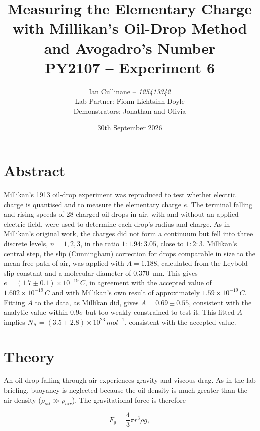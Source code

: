 \documentclass[12pt,a4paper]{article}
\title{
    \Large\textbf{Measuring the Elementary Charge with Millikan's Oil-Drop Method and Avogadro's Number}\\[0.5em]
    \large PY2107 -- Experiment 6
}
\author{
    Ian Cullinane -- \textit{125413342}\\[0.5em]
    Lab Partner: Fionn Lichtsinn Doyle\\[0.5em]
    Demonstrators: Jonathan and Olivia
}
\date{30th September 2026}
\begin{document}
\maketitle
\thispagestyle{empty}

\newpage
\tableofcontents
\newpage

\section{Abstract}

Millikan's 1913 oil-drop experiment was reproduced to test whether electric
charge is quantised and to measure the elementary charge $e$. The terminal
falling and rising speeds of 28 charged oil drops in air, with and without an
applied electric field, were used to determine each drop's radius and charge.
As in Millikan's original work, the charges did not form a continuum but fell
into three discrete levels, $n=1,2,3$, in the ratio $1:1.94:3.05$, close to
$1:2:3$. Millikan's central step, the slip (Cunningham) correction for drops
comparable in size to the mean free path of air, was applied with
$A=1.188$, calculated from the Leybold slip constant and a molecular diameter
of \SI{0.370}{nm}. This gives $e=(1.7\pm0.1)\times10^{-19}\,\si{C}$, in
agreement with the accepted value of $1.602\times10^{-19}\,\si{C}$ and with
Millikan's own result of approximately $1.59\times10^{-19}\,\si{C}$. Fitting
$A$ to the data, as Millikan did, gives $A=0.69\pm0.55$, consistent with the
analytic value within $0.9\sigma$ but too weakly constrained to test it. This
fitted $A$ implies $N_{\mathrm{A}}=(3.5\pm2.8)\times10^{23}\,\si{mol^{-1}}$,
consistent with the accepted value.

\newpage

\section{Theory}

An oil drop falling through air experiences gravity and viscous drag. As in
the lab briefing, buoyancy is neglected because the oil density is much
greater than the air density ($\rho_{oil} \gg \rho_{air}$). The gravitational force is therefore

\begin{equation}
    F_g = \frac{4}{3}\pi r^3\rho g,
\end{equation}
\end{document}
